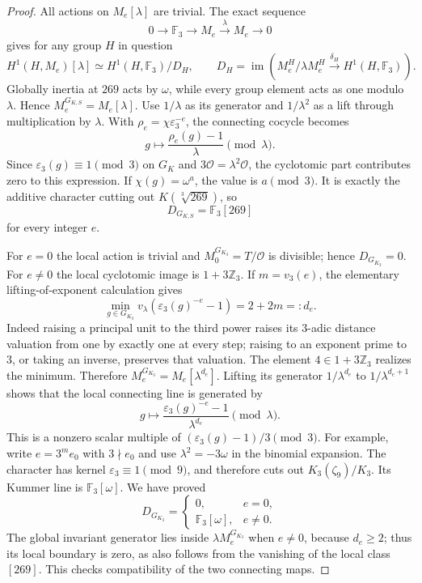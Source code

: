 \begin{proof}
All actions on $M_e[\lambda]$ are trivial.  The exact sequence
\[
 0\longrightarrow\mathbb F_3\longrightarrow M_e
     \xrightarrow{\lambda}M_e\longrightarrow0
\]
gives for any group $H$ in question
\[
 H^1(H,M_e)[\lambda]
  \simeq H^1(H,\mathbb F_3)/D_H,
 \qquad
 D_H=\operatorname{im}\left(
 M_e^H/\lambda M_e^H\xrightarrow{\delta_H}
 H^1(H,\mathbb F_3)\right).                            \tag{G22.3}
\]
Globally inertia at $269$ acts by $\omega$, while every group
element acts as one modulo $\lambda$.  Hence
$M_e^{G_{K,S}}=M_e[\lambda]$.
Use $1/\lambda$ as its generator and $1/\lambda^2$ as a lift through
multiplication by $\lambda$.  With
$\rho_e=\chi\varepsilon_3^{-e}$, the connecting cocycle becomes
\[
 g\longmapsto\frac{\rho_e(g)-1}{\lambda}\pmod\lambda.
\]
Since $\varepsilon_3(g)\equiv1\pmod3$ on $G_K$ and
$3\mathcal O=\lambda^2\mathcal O$, the cyclotomic part contributes
zero to this expression.  If $\chi(g)=\omega^a$, the value is
$a\pmod3$.  It is exactly the additive character cutting out
$K(\sqrt[3]{269})$, so
\[
 D_{G_{K,S}}=\mathbb F_3[269]                           \tag{G22.4}
\]
for every integer $e$.

For $e=0$ the local action is trivial and
$M_0^{G_{K_3}}=T/\mathcal O$ is divisible; hence
$D_{G_{K_3}}=0$.
For $e\ne0$ the local cyclotomic image is
$1+3\mathbb Z_3$.  If $m=v_3(e)$, the elementary lifting-of-exponent
calculation gives
\[
 \min_{g\in G_{K_3}}v_\lambda
       (\varepsilon_3(g)^{-e}-1)=2+2m=:d_e.
\]
Indeed raising a principal unit to the third power raises its
$3$-adic distance valuation from one by exactly one at every step;
raising to an exponent prime to $3$, or taking an inverse, preserves
that valuation.  The element $4\in1+3\mathbb Z_3$ realizes the
minimum.  Therefore
$M_e^{G_{K_3}}=M_e[\lambda^{d_e}]$.
Lifting its generator $1/\lambda^{d_e}$ to
$1/\lambda^{d_e+1}$ shows that the local connecting line is generated
by
\[
 g\longmapsto
  \frac{\varepsilon_3(g)^{-e}-1}{\lambda^{d_e}}\pmod\lambda.
\]
This is a nonzero scalar multiple of
$(\varepsilon_3(g)-1)/3\pmod3$.
For example, write $e=3^m e_0$ with $3\nmid e_0$ and use
$\lambda^2=-3\omega$ in the binomial expansion.  The character has
kernel $\varepsilon_3\equiv1\pmod9$, and therefore cuts out
$K_3(\zeta_9)/K_3$.  Its Kummer line is $\mathbb F_3[\omega]$.
We have proved
\[
 D_{G_{K_3}}=
 \begin{cases}0,&e=0,\\
 \mathbb F_3[\omega],&e\ne0.
 \end{cases}                                           \tag{G22.5}
\]
The global invariant generator lies inside
$\lambda M_e^{G_{K_3}}$ when $e\ne0$, because $d_e\geq2$;
thus its local boundary is zero, as also follows from the vanishing
of the local class $[269]$.  This checks compatibility of the two
connecting maps.


\end{proof}
